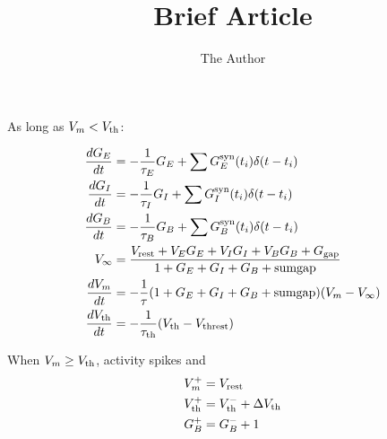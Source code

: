 \documentclass[12pt]{amsart}
\title{Brief Article}
\author{The Author}
\begin{document}

\noindent As long as $V_m < V_{\scriptstyle{\rm th}}$:

\begin{align*}
\frac{dG_E}{dt} &= -\dfrac{1}{\tau_E} G_E + \sum G_E^{\scriptstyle{\rm syn}}(t_i)\delta(t-t_i)\\
\frac{dG_I}{dt} &= -\dfrac{1}{\tau_I} G_I + \sum G_I^{\scriptstyle{\rm syn}}(t_i)\delta(t-t_i)\\
\frac{dG_B}{dt} &= -\dfrac{1}{\tau_B} G_B + \sum G_B^{\scriptstyle{\rm syn}}(t_i)\delta(t-t_i)\\
V_\infty &= \dfrac{V_{\scriptstyle{\rm rest}} + V_E G_E + V_I G_I + V_B G_B + G_{\scriptstyle{\rm gap}}}{1+G_E+G_I+G_B+\text{sumgap}}\\
\frac{dV_m}{dt} &= -\dfrac{1}{\tau}(1+G_E+G_I+G_B+\text{sumgap})(V_m-V_\infty)\\
\frac{dV_{\scriptstyle{\rm th}}}{dt} &= -\dfrac{1}{\tau_{\scriptstyle{\rm th}}}(V_{\scriptstyle{\rm th}}-V_{\scriptstyle{\rm threst}})
\\
\end{align*}

\noindent When $V_m\ge V_{\scriptstyle{\rm th}}$, activity spikes and
\begin{align*}
V_m^+ &= V_{\scriptstyle{\rm rest}}\\
V_{\scriptstyle{\rm th}}^+ &= V_{\scriptstyle{\rm th}}^- + \Delta V_{\scriptstyle{\rm th}}\\
G_B^+ &= G_B^- + 1
\end{align*}
\end{document}
